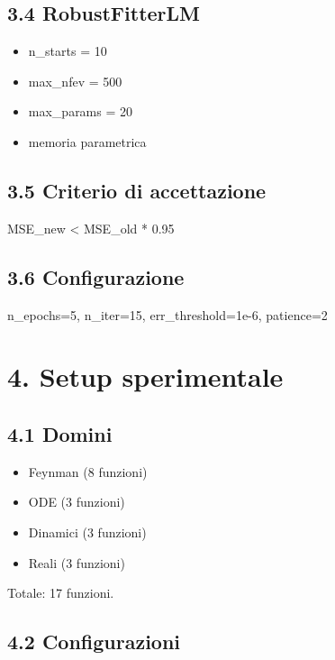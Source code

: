 \documentclass[
]{article}
\providecommand{\tightlist}{%
  \setlength{\itemsep}{0pt}\setlength{\parskip}{0pt}}
\begin{document}
\subsection{3.4 RobustFitterLM}\label{robustfitterlm}

\begin{itemize}
\tightlist
\item
  n\_starts = 10
\item
  max\_nfev = 500
\item
  max\_params = 20
\item
  memoria parametrica
\end{itemize}

\subsection{3.5 Criterio di
accettazione}\label{criterio-di-accettazione}

MSE\_new \textless{} MSE\_old * 0.95

\subsection{3.6 Configurazione}\label{configurazione}

n\_epochs=5, n\_iter=15, err\_threshold=1e-6, patience=2

\section{4. Setup sperimentale}\label{setup-sperimentale}

\subsection{4.1 Domini}\label{domini}

\begin{itemize}
\tightlist
\item
  Feynman (8 funzioni)
\item
  ODE (3 funzioni)
\item
  Dinamici (3 funzioni)
\item
  Reali (3 funzioni)
\end{itemize}

Totale: 17 funzioni.

\subsection{4.2 Configurazioni}\label{configurazioni}
\end{document}
